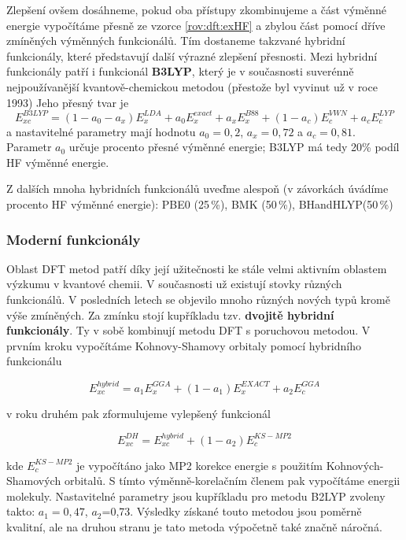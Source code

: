 Zlepšení ovšem dosáhneme, pokud oba přístupy zkombinujeme a část výměnné energie vypočítáme přesně ze vzorce \ref{rov:dft:exHF} a zbylou část pomocí dříve zmíněných výměnných funkcionálů. Tím dostaneme takzvané hybridní funkcionály, které představují další výrazné zlepšení přesnosti.
Mezi hybridní funkcionály patří i funkcionál \textbf{B3LYP}, který je v současnosti suverénně nejpoužívanější kvantově-chemickou metodou (přestože byl vyvinut už v roce 1993)
Jeho přesný tvar je
\begin{equation}
E_{xc}^{B3LYP}=(1-a_0-a_x)E_x^{LDA}+a_0E_x^{exact}+a_xE_x^{B88}+(1-a_c)E_c^{VWN}+a_c E_c^{LYP}
\end{equation}
a nastavitelné parametry mají hodnotu $a_0=0,2$, $a_x=0,72$ a $a_c=0,81$.
Parametr $a_0$ určuje procento přesné výměnné energie; B3LYP má tedy 20\% podíl HF výměnné energie.

Z dalších mnoha hybridních funkcionálů uveďme alespoň (v závorkách úvádíme procento HF výměnné energie): PBE0 (25\,\%), BMK (50\,\%), BHandHLYP(50\,\%)

\subsubsection{Moderní funkcionály}
Oblast DFT metod patří díky její užitečnosti ke stále velmi aktivním oblastem výzkumu v kvantové chemii. V současnosti už existují stovky různých funkcionálů. V posledních letech se objevilo mnoho různých nových typů kromě výše zmíněných. Za zmínku stojí kupříkladu tzv. \textbf{dvojitě hybridní funkcionály}. Ty v sobě kombinují metodu DFT s poruchovou metodou. V prvním kroku vypočítáme Kohnovy-Shamovy orbitaly pomocí hybridního funkcionálu

\begin{equation}
E_{xc}^{hybrid}=a_1E_x^{GGA}+(1-a_1)E_x^{EXACT}+a_2E_c^{GGA}
\end{equation}

v roku druhém pak zformulujeme vylepšený funkcionál

\begin{equation}
E_{xc}^{DH}=E_{xc}^{hybrid}+(1-a_2)E_c^{KS-MP2}
\end{equation}

kde $E_c^{KS-MP2}$ je vypočítáno jako MP2 korekce energie s použitím Kohnových-Shamových orbitalů. S tímto výměnně-korelačním členem pak vypočítáme energii molekuly. Nastavitelné parametry jsou kupříkladu pro metodu B2LYP zvoleny takto: $a_1=0,47$, $a_2$=0,73.
Výsledky získané touto metodou jsou poměrně kvalitní, ale na druhou stranu je tato metoda výpočetně také značně náročná.

